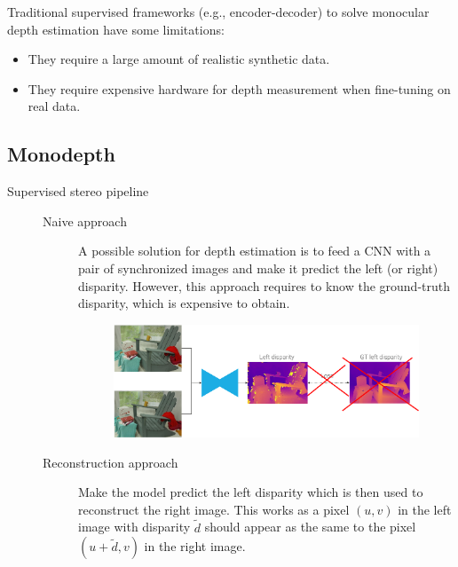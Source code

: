 \begin{remark}
    Traditional supervised frameworks (e.g., encoder-decoder) to solve monocular depth estimation have some limitations:
    \begin{itemize}
        \item They require a large amount of realistic synthetic data.
        \item They require expensive hardware for depth measurement when fine-tuning on real data.
    \end{itemize}
\end{remark}


\subsection{Monodepth}

\begin{description}
    \item[Supervised stereo pipeline] 
        \phantom{}
        \begin{description}
            \item[Naive approach] 
                A possible solution for depth estimation is to feed a CNN with a pair of synchronized images and make it predict the left (or right) disparity. However, this approach requires to know the ground-truth disparity, which is expensive to obtain.

                \begin{figure}[H]
                    \centering
                    \includegraphics[width=0.7\linewidth]{./img/_stereo_pipeline_naive.pdf}
                \end{figure}

            \item[Reconstruction approach]
                Make the model predict the left disparity which is then used to reconstruct the right image. This works as a pixel $(u, v)$ in the left image with disparity $\tilde{d}$ should appear as the same to the pixel $(u+\tilde{d}, v)$ in the right image.


\end{description}
\end{description}
